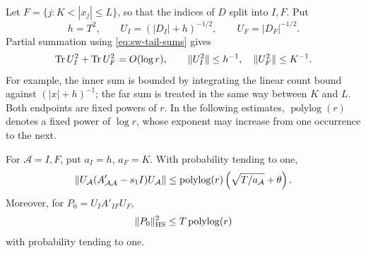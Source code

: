 Let \(F=\{j:K<|x_j|\le L\}\), so that the indices of \(D\) split into \(I,F\).
Put
\begin{equation}\label{eq:sw-weights}
 h=T^2,\qquad U_I=(|D_I|+h)^{-1/2},\qquad
 U_F=|D_F|^{-1/2}.
\end{equation}
Partial summation using \eqref{eq:sw-tail-sums} gives
\begin{equation}\label{eq:sw-weight-bounds}
 \operatorname{Tr} U_I^2+\operatorname{Tr} U_F^2=O(\log r),\qquad
 \|U_I^2\|\le h^{-1},\quad \|U_F^2\|\le K^{-1}.
\end{equation}
For example, the inner sum is bounded by integrating the linear count
bound against \((|x|+h)^{-1}\); the far sum is treated in the same way
between \(K\) and \(L\). Both endpoints are fixed powers of \(r\).
In the following estimates, \(\operatorname{polylog}(r)\) denotes a fixed
power of \(\log r\), whose exponent may increase from one occurrence
to the next.

\begin{lemma}\label{sw:weighted-blocks}
For \(\mathcal A=I,F\), put \(a_I=h\), \(a_F=K\). With probability tending
to one,
\begin{equation}\label{eq:sw-bernstein}
 \left\|U_{\mathcal A}
       (A'_{\mathcal A\mathcal A}-s_1I)
       U_{\mathcal A}\right\|
 \le \operatorname{polylog}(r)
       \left(\sqrt{T/a_{\mathcal A}}+\theta\right).
\end{equation}
Moreover, for \(P_0=U_IA'_{IF}U_F\),
\begin{equation}\label{eq:sw-cross-block}
 \|P_0\|_{\mathrm{HS}}^2\le T\operatorname{polylog}(r)
\end{equation}
with probability tending to one.
\end{lemma}

